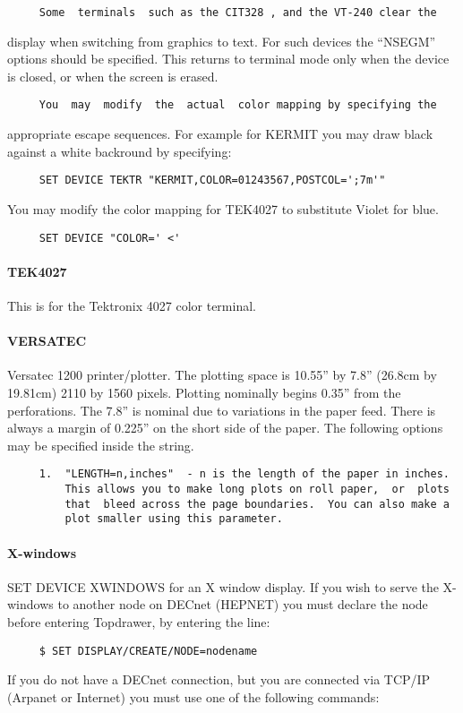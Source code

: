 \begin{verbatim}
     Some  terminals  such as the CIT328 , and the VT-240 clear the
\end{verbatim}
display when switching from graphics to text.  For such devices the
``NSEGM'' options should be specified.  This returns to terminal mode
only when the device is closed, or when the screen is erased.  

\begin{verbatim}
     You  may  modify  the  actual  color mapping by specifying the
\end{verbatim}
appropriate escape sequences.  For example for KERMIT you may  draw
black against a white backround by specifying:  
\begin{verbatim}
     SET DEVICE TEKTR "KERMIT,COLOR=01243567,POSTCOL=';7m'" 
\end{verbatim}
You  may  modify the color mapping for TEK4027 to substitute Violet
for blue.  
\begin{verbatim}
     SET DEVICE "COLOR=' <' 
\end{verbatim}
\paragraph{TEK4027}
This is for the Tektronix 4027 color terminal.  
\paragraph{VERSATEC}
Versatec  1200 printer/plotter.  The plotting space is 10.55'' by 7.8''
(26.8cm by 19.81cm) 2110 by 1560 pixels.  Plotting  nominally  begins
0.35''  from  the perforations.  The 7.8'' is nominal due to variations
in the paper feed.  There is always a margin of 0.225'' on  the  short
side of the paper.  The following options may be specified inside the
string.  
\begin{verbatim}
     1.  "LENGTH=n,inches"  - n is the length of the paper in inches.
         This allows you to make long plots on roll paper,  or  plots
         that  bleed across the page boundaries.  You can also make a
         plot smaller using this parameter.  
\end{verbatim}

\paragraph{X-windows}
SET  DEVICE  XWINDOWS  for an X window display.  If you wish to serve
the X-windows to another node on DECnet (HEPNET) you must declare the
node before entering Topdrawer, by entering the line:  
\begin{verbatim}
     $ SET DISPLAY/CREATE/NODE=nodename 
\end{verbatim}
If  you  do  not  have a DECnet connection, but you are connected via
TCP/IP (Arpanet or Internet)  you  must  use  one  of  the  following
commands:  

